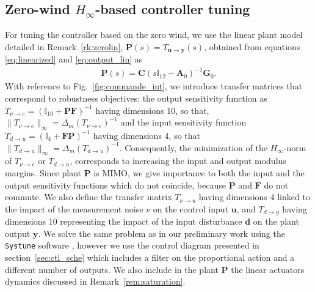 \subsection{\texorpdfstring{Zero-wind $H_{\infty}$}{H {infty}}-based controller tuning }
\label{sec:zerowind}
For tuning the controller based on the zero wind, we use the linear plant model detailed in Remark~\ref{rk:zerolin}, $\boldsymbol{P}(s) = T_{\boldsymbol{u} \rightarrow \boldsymbol{y}}(s)$, obtained from equations \eqref{eq:linearized} and \eqref{eq:output_lin} as
\begin{align*}
    \boldsymbol{P}(s) = \boldsymbol{C} (s \mathbb{I}_{12} - \boldsymbol{A}_{0})^{-1} \boldsymbol{G}_{0}.
\end{align*} 
With reference to Fig.~\ref{fig:commande_int}, we introduce transfer matrices that correspond to robustness objectives: the output sensitivity function as $T_{\nu \rightarrow e}=(\mathbb{I}_{10}+\boldsymbol{P}\boldsymbol{F})^{-1}$ having dimensions 10, so that, $\lVert T_{\nu \rightarrow e} \rVert_{\infty}=\Delta_m(T_{\nu \rightarrow e})^{-1} $
and the input sensitivity function $T_{d \rightarrow u}=(\mathbb{I}_{4}+\boldsymbol{F}\boldsymbol{P})^{-1}$ having dimensions 4, so that $\lVert T_{d \rightarrow u} \rVert_{\infty}=\Delta_m(T_{d \rightarrow u})^{-1}$.
Consequently, the minimization of the  $H_{\infty}$-norm of $T_{\nu \rightarrow e}$ or $T_{d \rightarrow u}$, corresponds to increasing the input and output modulus margins. Since plant $\boldsymbol{P}$ is MIMO, we give importance to both the input and the output sensitivity functions which do not coincide, because $\boldsymbol{P}$ and $\boldsymbol{F}$ do not commute.
%
We also define the transfer matrix $T_{\nu \rightarrow u}$ having dimensions 4 linked to the impact of the measurement noise $\nu$ on the control input $\boldsymbol{u}$, and $T_{d \rightarrow y}$ having dimensions 10 representing the impact of the input disturbance $\boldsymbol{d}$ on the plant output $\boldsymbol{y}$. 
We solve the same problem as in our preliminary work \cite[eqn. (13)]{SANSOU:ACA} using the {\tt Systune} software \cite{1576856}, however we use the control diagram presented in section~\ref{sec:ctl_sche} which includes a filter on the proportional action and a different number of outputs. We also include in the plant $\boldsymbol{P}$ the linear actuators dynamics discussed in Remark~\ref{rem:saturation}.

